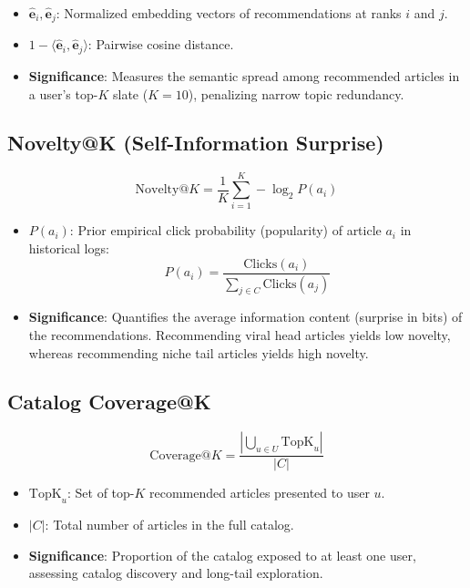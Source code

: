 \documentclass[11pt,a4paper]{article}
\begin{document}
\begin{itemize}
  \item $\mathbf{\hat{e}}_i, \mathbf{\hat{e}}_j$: Normalized embedding vectors of recommendations at ranks $i$ and $j$.
  \item $1 - \langle \mathbf{\hat{e}}_i, \mathbf{\hat{e}}_j \rangle$: Pairwise cosine distance.
  \item \textbf{Significance}: Measures the semantic spread among recommended articles in a user's top-$K$ slate ($K = 10$), penalizing narrow topic redundancy.
\end{itemize}

\subsection{Novelty@K (Self-Information Surprise)}
\begin{equation}
\text{Novelty}@K = \frac{1}{K} \sum_{i=1}^K -\log_2 P(a_i)
\end{equation}

\begin{itemize}
  \item $P(a_i)$: Prior empirical click probability (popularity) of article $a_i$ in historical logs:
  \begin{equation}
  P(a_i) = \frac{\text{Clicks}(a_i)}{\sum_{j \in C} \text{Clicks}(a_j)}
  \end{equation}
  \item \textbf{Significance}: Quantifies the average information content (surprise in bits) of the recommendations. Recommending viral head articles yields low novelty, whereas recommending niche tail articles yields high novelty.
\end{itemize}

\subsection{Catalog Coverage@K}
\begin{equation}
\text{Coverage}@K = \frac{\left|\bigcup_{u \in U} \text{TopK}_u\right|}{|C|}
\end{equation}

\begin{itemize}
  \item $\text{TopK}_u$: Set of top-$K$ recommended articles presented to user $u$.
  \item $|C|$: Total number of articles in the full catalog.
  \item \textbf{Significance}: Proportion of the catalog exposed to at least one user, assessing catalog discovery and long-tail exploration.
\end{itemize}
\end{document}
